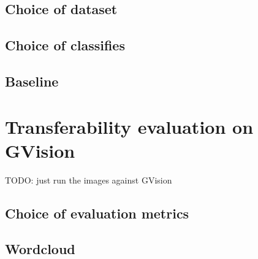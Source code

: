 \subsection{Choice of dataset}

\subsection{Choice of classifies}

\subsection{Baseline}

\section{Transferability evaluation on GVision}
TODO: just run the images against GVision

\subsection{Choice of evaluation metrics}

\subsection{Wordcloud}